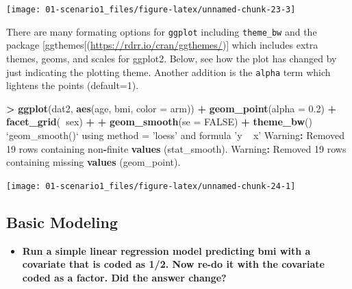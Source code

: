 \documentclass[
]{book}
\newenvironment{Shaded}{\begin{snugshade}}{\end{snugshade}}
\newcommand{\DataTypeTok}[1]{\textcolor[rgb]{0.13,0.29,0.53}{#1}}
\newcommand{\DecValTok}[1]{\textcolor[rgb]{0.00,0.00,0.81}{#1}}
\newcommand{\FloatTok}[1]{\textcolor[rgb]{0.00,0.00,0.81}{#1}}
\newcommand{\KeywordTok}[1]{\textcolor[rgb]{0.13,0.29,0.53}{\textbf{#1}}}
\newcommand{\NormalTok}[1]{#1}
\newcommand{\OperatorTok}[1]{\textcolor[rgb]{0.81,0.36,0.00}{\textbf{#1}}}
\newcommand{\OtherTok}[1]{\textcolor[rgb]{0.56,0.35,0.01}{#1}}
\newcommand{\StringTok}[1]{\textcolor[rgb]{0.31,0.60,0.02}{#1}}
\providecommand{\tightlist}{%
  \setlength{\itemsep}{0pt}\setlength{\parskip}{0pt}}
\begin{document}
\begin{center}\texttt{[image: 01-scenario1\_files/figure-latex/unnamed-chunk-23-3]} \end{center}

There are many formating options for \texttt{ggplot} including \texttt{theme\_bw} and the package {[}ggthemes{[}(\url{https://rdrr.io/cran/ggthemes/}){]} which includes extra themes, geoms, and scales for ggplot2. Below, see how the plot has changed by just indicating the plotting theme. Another addition is the \texttt{alpha} term which lightens the points (default=1).

\begin{Shaded}
\begin{Highlighting}[]
\OperatorTok{>}\StringTok{ }\KeywordTok{ggplot}\NormalTok{(dat2, }\KeywordTok{aes}\NormalTok{(age, bmi, }\DataTypeTok{color =}\NormalTok{ arm)) }\OperatorTok{+}\StringTok{ }\KeywordTok{geom_point}\NormalTok{(}\DataTypeTok{alpha =} \FloatTok{0.2}\NormalTok{) }\OperatorTok{+}\StringTok{ }\KeywordTok{facet_grid}\NormalTok{(}\OperatorTok{~}\NormalTok{sex) }\OperatorTok{+}\StringTok{ }
\OperatorTok{+}\StringTok{     }\KeywordTok{geom_smooth}\NormalTok{(}\DataTypeTok{se =} \OtherTok{FALSE}\NormalTok{) }\OperatorTok{+}\StringTok{ }\KeywordTok{theme_bw}\NormalTok{()}
\StringTok{`}\DataTypeTok{geom_smooth()}\StringTok{`}\NormalTok{ using method =}\StringTok{ 'loess'}\NormalTok{ and formula }\StringTok{'y ~ x'}
\NormalTok{Warning}\OperatorTok{:}\StringTok{ }\NormalTok{Removed }\DecValTok{19}\NormalTok{ rows containing non}\OperatorTok{-}\NormalTok{finite }\KeywordTok{values}\NormalTok{ (stat_smooth).}
\NormalTok{Warning}\OperatorTok{:}\StringTok{ }\NormalTok{Removed }\DecValTok{19}\NormalTok{ rows containing missing }\KeywordTok{values}\NormalTok{ (geom_point).}
\end{Highlighting}
\end{Shaded}

\begin{center}\texttt{[image: 01-scenario1\_files/figure-latex/unnamed-chunk-24-1]} \end{center}

\hypertarget{basic-modeling}{%
\subsection{Basic Modeling}\label{basic-modeling}}

\begin{itemize}
\tightlist
\item
  \textbf{Run a simple linear regression model predicting bmi with a covariate that is coded as 1/2. Now re-do it with the covariate coded as a factor. Did the answer change?}
\end{itemize}
\end{document}
